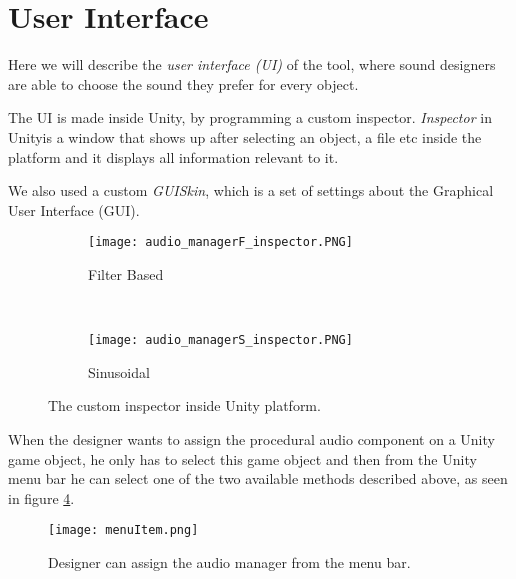 \section{User Interface}
Here we will describe the \textit{user interface (UI)} of the tool, where sound designers are able to choose the sound they prefer for every object.

The UI is made inside Unity\textregistered, by programming a custom inspector. \textit{Inspector} in Unity\textregistered is a window that shows up after selecting an object, a file etc inside the platform and it displays all information relevant to it.

We also used a custom \textit{GUISkin}, which is a set of settings about the Graphical User Interface (GUI). 

\begin{figure}[H]
    \centering
    \begin{subfigure}[b]{0.4\textwidth}
        \texttt{[image: audio\_managerF\_inspector.PNG]}
        \caption{Filter Based}
        \label{fig:FB}
    \end{subfigure}
    ~ %
    \begin{subfigure}[b]{0.4\textwidth}
        \texttt{[image: audio\_managerS\_inspector.PNG]}
        \caption{Sinusoidal}
        \label{fig:sin}
    \end{subfigure}
    \caption{The custom inspector inside Unity platform.}\label{fig:custom_insp}
\end{figure}

When the designer wants to assign the procedural audio component on a Unity game object, he only has to select this game object and then from the Unity menu bar he can select one of the two available methods described above, as seen in figure \ref{fig:menu_item}.
\begin{figure}[H]
  \centering
    \texttt{[image: menuItem.png]}
      \caption{Designer can assign the audio manager from the menu bar.}
      \label{fig:menu_item}
\end{figure}

